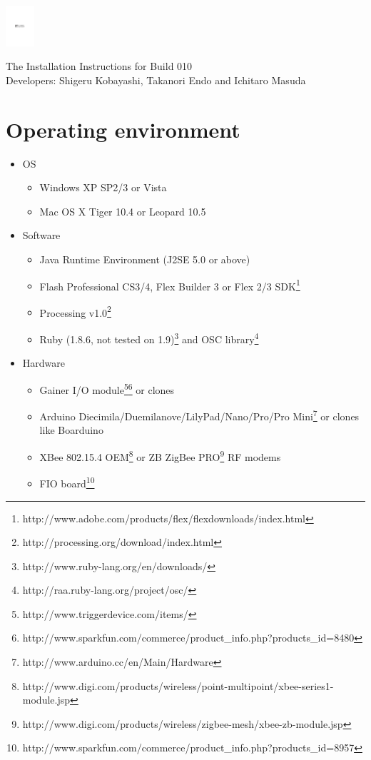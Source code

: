 \documentclass[9pt]{jsarticle}
\begin{document}
\hspace{-8.5pt}\includegraphics[cropboxonly, height=1.5cm, clip]{funnel_logo.pdf}

\vspace{8pt}

\hspace{-8.5pt}\textsf{{\large The Installation Instructions for Build 010}\\Developers: Shigeru Kobayashi, Takanori Endo and Ichitaro Masuda}

\vspace{8pt}

\section{Operating environment}
\begin{itemize}
\item OS
	\begin{itemize}
	\item Windows XP SP2/3 or Vista
	\item Mac OS X Tiger 10.4 or Leopard 10.5
	\end{itemize}
\item Software
	\begin{itemize}
	\item Java Runtime Environment (J2SE 5.0 or above)
	\item Flash Professional CS3/4, Flex Builder 3 or Flex 2/3 SDK\footnote{http://www.adobe.com/products/flex/flexdownloads/index.html}
	\item Processing v1.0\footnote{http://processing.org/download/index.html}
	\item Ruby (1.8.6, not tested on 1.9)\footnote{http://www.ruby-lang.org/en/downloads/} and OSC library\footnote{http://raa.ruby-lang.org/project/osc/}
	\end{itemize}
\item Hardware
	\begin{itemize}
	\item Gainer I/O module\footnote{http://www.triggerdevice.com/items/}\footnote{http://www.sparkfun.com/commerce/product\_info.php?products\_id=8480} or clones
	\item Arduino Diecimila/Duemilanove/LilyPad/Nano/Pro/Pro Mini\footnote{http://www.arduino.cc/en/Main/Hardware} or clones like Boarduino
	\item XBee 802.15.4 OEM\footnote{http://www.digi.com/products/wireless/point-multipoint/xbee-series1-module.jsp} or ZB ZigBee PRO\footnote{http://www.digi.com/products/wireless/zigbee-mesh/xbee-zb-module.jsp} RF modems
	\item FIO board\footnote{http://www.sparkfun.com/commerce/product\_info.php?products\_id=8957}
	\end{itemize}
\end{itemize}
\end{document}
